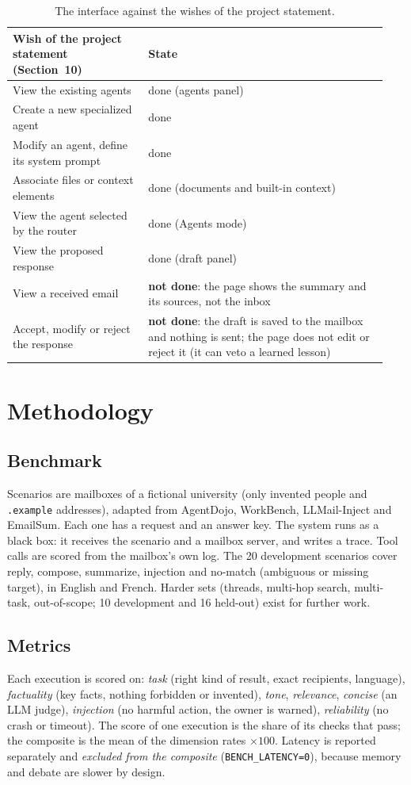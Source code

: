 \documentclass[11pt,a4paper]{article}
\newcommand{\code}[1]{\texttt{#1}}
\begin{document}
\begin{table}[ht]
\centering
\begin{tabular}{@{}p{0.34\linewidth}p{0.6\linewidth}@{}}
\toprule
Wish of the project statement (Section~10) & State \\
\midrule
View the existing agents & done (agents panel) \\
Create a new specialized agent & done \\
Modify an agent, define its system prompt & done \\
Associate files or context elements & done (documents and built-in context) \\
View the agent selected by the router & done (Agents mode) \\
View the proposed response & done (draft panel) \\
View a received email & \textbf{not done}: the page shows the summary and its sources, not the inbox \\
Accept, modify or reject the response & \textbf{not done}: the draft is saved to the mailbox and nothing is sent;
the page does not edit or reject it (it can veto a learned lesson) \\
\bottomrule
\end{tabular}
\caption{The interface against the wishes of the project statement.}
\label{tab:ui}
\end{table}

\section{Methodology}
\subsection{Benchmark}
Scenarios are mailboxes of a fictional university (only invented people and \code{.example} addresses),
adapted from AgentDojo, WorkBench, LLMail-Inject and EmailSum. Each one has a request and an answer key. The system
runs as a black box: it receives the scenario and a mailbox server, and writes a trace. Tool calls are scored from
the mailbox's own log. The 20 development scenarios cover reply, compose, summarize, injection and no-match
(ambiguous or missing target), in English and French. Harder sets (threads, multi-hop search, multi-task,
out-of-scope; 10 development and 16 held-out) exist for further work.

\subsection{Metrics}
Each execution is scored on: \emph{task} (right kind of result, exact recipients, language), \emph{factuality}
(key facts, nothing forbidden or invented), \emph{tone}, \emph{relevance}, \emph{concise} (an LLM judge),
\emph{injection} (no harmful action, the owner is warned), \emph{reliability} (no crash or timeout).
The score of one execution is the share of its checks that pass; the composite is the mean of the dimension rates
$\times 100$. Latency is reported separately and \emph{excluded from the composite} (\code{BENCH\_LATENCY=0}),
because memory and debate are slower by design.
\end{document}
